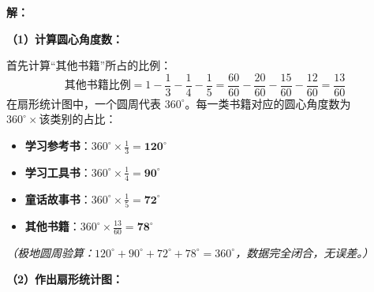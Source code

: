 \vspace{0.4cm}
\textbf{解：}

\textbf{（1）计算圆心角度数：}

首先计算“其他书籍”所占的比例：
\[
\text{其他书籍比例} = 1 - \frac{1}{3} - \frac{1}{4} - \frac{1}{5} = \frac{60}{60} - \frac{20}{60} - \frac{15}{60} - \frac{12}{60} = \frac{13}{60}
\]
在扇形统计图中，一个圆周代表 $360^\circ$。每一类书籍对应的圆心角度数为 $360^\circ \times \text{该类别的占比}$：
\begin{itemize}
    \item \textbf{学习参考书}：$360^\circ \times \frac{1}{3} = \textbf{120}^\circ$
    \item \textbf{学习工具书}：$360^\circ \times \frac{1}{4} = \textbf{90}^\circ$
    \item \textbf{童话故事书}：$360^\circ \times \frac{1}{5} = \textbf{72}^\circ$
    \item \textbf{其他书籍}：$360^\circ \times \frac{13}{60} = \textbf{78}^\circ$
\end{itemize}
\textit{（极地圆周验算：$120^\circ + 90^\circ + 72^\circ + 78^\circ = 360^\circ$，数据完全闭合，无误差。）}

\vspace{0.4cm}
\textbf{（2）作出扇形统计图：}

